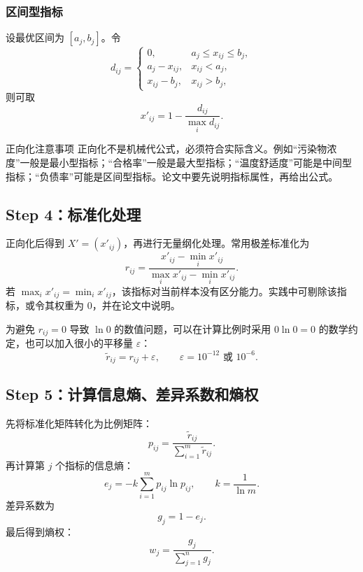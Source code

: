 \documentclass[UTF8,a4paper,12pt]{ctexart}
\begin{document}
\subsubsection{区间型指标}
设最优区间为 $[a_j,b_j]$。令
\begin{equation}
 d_{ij}=\begin{cases}
0, & a_j\le x_{ij}\le b_j,\\
a_j-x_{ij}, & x_{ij}<a_j,\\
x_{ij}-b_j, & x_{ij}>b_j,
\end{cases}
\end{equation}
则可取
\begin{equation}
 x'_{ij}=1-\frac{d_{ij}}{\max_i d_{ij}}.
\end{equation}

\begin{warnbox}{正向化注意事项}
正向化不是机械代公式，必须符合实际含义。例如“污染物浓度”一般是最小型指标；“合格率”一般是最大型指标；“温度舒适度”可能是中间型指标；“负债率”可能是区间型指标。论文中要先说明指标属性，再给出公式。
\end{warnbox}

\subsection{Step 4：标准化处理}

正向化后得到 $X'=(x'_{ij})$，再进行无量纲化处理。常用极差标准化为
\begin{equation}
 r_{ij}=\frac{x'_{ij}-\min_i x'_{ij}}{\max_i x'_{ij}-\min_i x'_{ij}}.
\end{equation}
若 $\max_i x'_{ij}=\min_i x'_{ij}$，该指标对当前样本没有区分能力。实践中可剔除该指标，或令其权重为 $0$，并在论文中说明。

为避免 $r_{ij}=0$ 导致 $\ln 0$ 的数值问题，可以在计算比例时采用 $0\ln 0=0$ 的数学约定，也可以加入很小的平移量 $\varepsilon$：
\begin{equation}
\tilde r_{ij}=r_{ij}+\varepsilon,\qquad \varepsilon=10^{-12}\text{ 或 }10^{-6}.
\end{equation}

\subsection{Step 5：计算信息熵、差异系数和熵权}

先将标准化矩阵转化为比例矩阵：
\begin{equation}
 p_{ij}=\frac{\tilde r_{ij}}{\sum_{i=1}^{m}\tilde r_{ij}}.
\end{equation}
再计算第 $j$ 个指标的信息熵：
\begin{equation}
 e_j=-k\sum_{i=1}^{m}p_{ij}\ln p_{ij},\qquad k=\frac{1}{\ln m}.
\end{equation}
差异系数为
\begin{equation}
 g_j=1-e_j.
\end{equation}
最后得到熵权：
\begin{equation}
 w_j=\frac{g_j}{\sum_{j=1}^{n}g_j}.
\end{equation}
\end{document}
